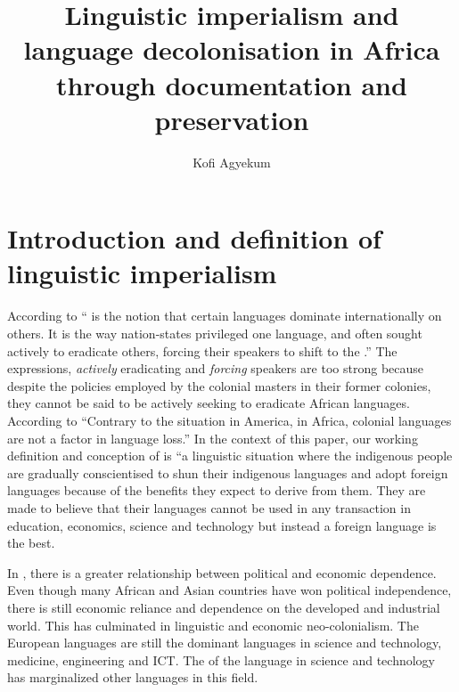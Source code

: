 \documentclass[output=paper,
modfonts
]{langscibook}
\title{Linguistic imperialism and language decolonisation in Africa through documentation and preservation}
\author{Kofi Agyekum \affiliation{The University of Kansas}}
\begin{document}
\maketitle
 


\section{Introduction and definition of linguistic imperialism}

According to \citet[780]{Phillipson2009} “ is the notion that certain languages dominate internationally on others. It is the way nation-states privileged one language, and often sought actively to eradicate others, forcing their speakers to shift to the .” The expressions, \textit{actively} eradicating and \textit{forcing} speakers are too strong because despite the policies employed by the colonial masters in their former colonies, they cannot be said to be actively seeking to eradicate African languages. According to \citet[158]{Mous2003} “Contrary to the situation in  America, in Africa, colonial languages are not a  factor in language loss.” In the context of this paper, our working definition and conception of  is “a linguistic situation where the indigenous people are gradually conscientised to shun their indigenous languages and adopt foreign languages because of the benefits they expect to derive from them. They are made to believe that their languages cannot be used in any transaction in education, economics, science and technology but instead a foreign language is the best.

In , there is a greater relationship between political and economic dependence. Even though many African and Asian countries have won political independence, there is still economic reliance and dependence on the developed and industrial world. This has culminated in linguistic and economic neo-colonialism. The European languages are still the dominant languages in science and technology, medicine, engineering and ICT. The  of the  language in science and technology has marginalized other languages in this field.
\end{document}
